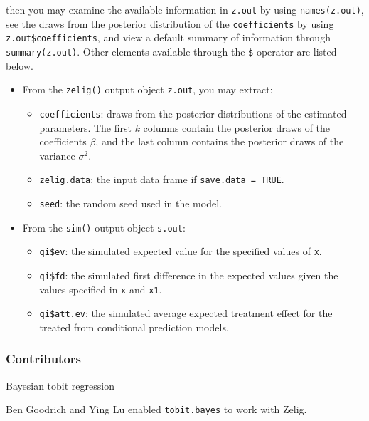 \noindent then you may examine the available information in \texttt{z.out} by
using \texttt{names(z.out)}, see the draws from the posterior distribution of
the \texttt{coefficients} by using \texttt{z.out\$coefficients}, and view a 
default summary of information through \texttt{summary(z.out)}. Other elements
available through the \texttt{\$} operator are listed below.

\begin{itemize}
\item From the \texttt{zelig()} output object \texttt{z.out}, you may extract:

\begin{itemize}
\item \texttt{coefficients}: draws from the posterior distributions
of the estimated parameters. The first $k$ columns contain the posterior draws
of the coefficients $\beta$, and the last column contains the posterior draws 
of the variance $\sigma^2$.

   \item {\tt zelig.data}: the input data frame if {\tt save.data = TRUE}.  
\item \texttt{seed}: the random seed used in the model.

\end{itemize}

\item From the \texttt{sim()} output object \texttt{s.out}:

\begin{itemize}
\item \texttt{qi\$ev}: the simulated expected value for the specified
values of \texttt{x}.

\item \texttt{qi\$fd}: the simulated first difference in the expected
values given the values specified in \texttt{x} and \texttt{x1}.

\item \texttt{qi\$att.ev}: the simulated average expected treatment effect
for the treated from conditional prediction models.

\end{itemize}
\end{itemize}

\subsubsection{Contributors}
Bayesian tobit regression 

\noindent Ben Goodrich and Ying Lu enabled \texttt{tobit.bayes} to work with Zelig.




%
